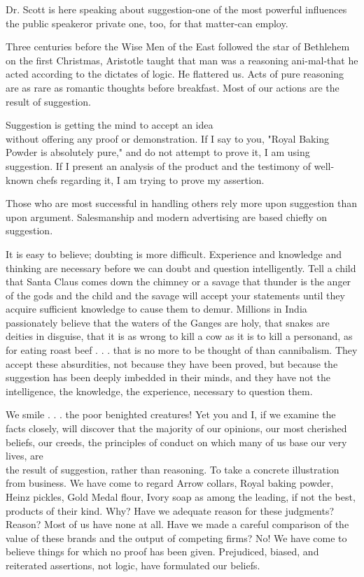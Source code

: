 \documentclass[10pt]{article}
\begin{document}
Dr. Scott is here speaking about suggestion-one of the most powerful influences the public speakeror private one, too, for that matter-can employ.

Three centuries before the Wise Men of the East followed the star of Bethlehem on the first Christmas, Aristotle taught that man was a reasoning ani-mal-that he acted according to the dictates of logic. He flattered us. Acts of pure reasoning are as rare as romantic thoughts before breakfast. Most of our actions are the result of suggestion.

Suggestion is getting the mind to accept an idea\\
without offering any proof or demonstration. If I say to you, "Royal Baking Powder is absolutely pure," and do not attempt to prove it, I am using suggestion. If I present an analysis of the product and the testimony of well-known chefs regarding it, I am trying to prove my assertion.

Those who are most successful in handling others rely more upon suggestion than upon argument. Salesmanship and modern advertising are based chiefly on suggestion.

It is easy to believe; doubting is more difficult. Experience and knowledge and thinking are necessary before we can doubt and question intelligently. Tell a child that Santa Claus comes down the chimney or a savage that thunder is the anger of the gods and the child and the savage will accept your statements until they acquire sufficient knowledge to cause them to demur. Millions in India passionately believe that the waters of the Ganges are holy, that snakes are deities in disguise, that it is as wrong to kill a cow as it is to kill a personand, as for eating roast beef . . . that is no more to be thought of than cannibalism. They accept these absurdities, not because they have been proved, but because the suggestion has been deeply imbedded in their minds, and they have not the intelligence, the knowledge, the experience, necessary to question them.

We smile . . . the poor benighted creatures! Yet you and I, if we examine the facts closely, will discover that the majority of our opinions, our most cherished beliefs, our creeds, the principles of conduct on which many of us base our very lives, are\\
the result of suggestion, rather than reasoning. To take a concrete illustration from business. We have come to regard Arrow collars, Royal baking powder, Heinz pickles, Gold Medal flour, Ivory soap as among the leading, if not the best, products of their kind. Why? Have we adequate reason for these judgments? Reason? Most of us have none at all. Have we made a careful comparison of the value of these brands and the output of competing firms? No! We have come to believe things for which no proof has been given. Prejudiced, biased, and reiterated assertions, not logic, have formulated our beliefs.
\end{document}
